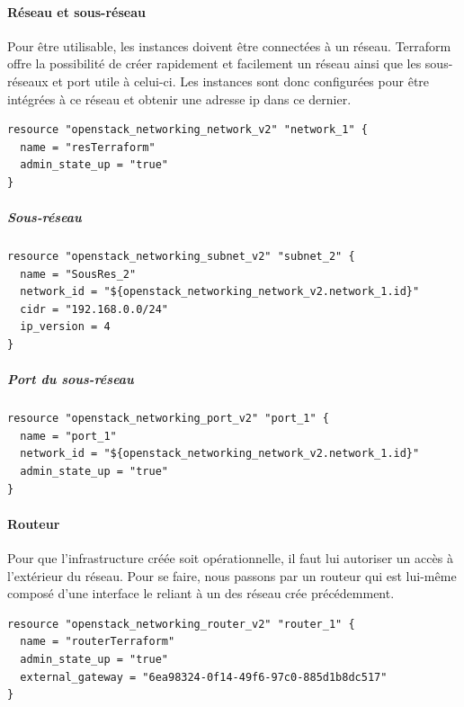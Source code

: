 \documentclass[]{article}
\let\oldparagraph\paragraph
\renewcommand{\paragraph}[1]{\oldparagraph{#1}\mbox{}}
\let\oldsubparagraph\subparagraph
\renewcommand{\subparagraph}[1]{\oldsubparagraph{#1}\mbox{}}
\begin{document}
\paragraph{Réseau et sous-réseau}\label{ruxe9seau-et-sous-ruxe9seau}

Pour être utilisable, les instances doivent être connectées à un réseau.
Terraform offre la possibilité de créer rapidement et facilement un
réseau ainsi que les sous-réseaux et port utile à celui-ci. Les
instances sont donc configurées pour être intégrées à ce réseau et
obtenir une adresse ip dans ce dernier. 
\begin{verbatim}
resource "openstack_networking_network_v2" "network_1" {
  name = "resTerraform"
  admin_state_up = "true"
}
\end{verbatim}

\subparagraph{Sous-réseau}\label{sous-ruxe9seau}
\begin{verbatim}
resource "openstack_networking_subnet_v2" "subnet_2" {
  name = "SousRes_2"
  network_id = "${openstack_networking_network_v2.network_1.id}"
  cidr = "192.168.0.0/24"
  ip_version = 4 
}
\end{verbatim}

\subparagraph{Port du sous-réseau}\label{port-du-sous-ruxe9seau}
\begin{verbatim}
resource "openstack_networking_port_v2" "port_1" {
  name = "port_1"
  network_id = "${openstack_networking_network_v2.network_1.id}"
  admin_state_up = "true"
}
\end{verbatim}

\paragraph{Routeur}\label{routeur}

Pour que l'infrastructure créée soit opérationnelle, il faut lui
autoriser un accès à l'extérieur du réseau. Pour se faire, nous passons
par un routeur qui est lui-même composé d'une interface le reliant à un
des réseau crée précédemment.
\begin{verbatim}
resource "openstack_networking_router_v2" "router_1" {
  name = "routerTerraform"
  admin_state_up = "true"
  external_gateway = "6ea98324-0f14-49f6-97c0-885d1b8dc517"
}
\end{verbatim}
\end{document}
